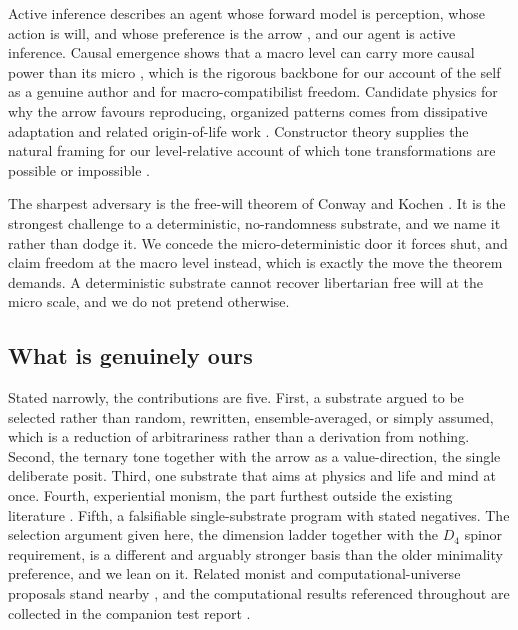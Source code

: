 Active inference describes an agent whose forward model is perception, whose action is will, and whose preference
is the arrow \cite{friston2010}, and our agent is active inference. Causal emergence shows that a macro level can
carry more causal power than its micro \cite{hoel2013}, which is the rigorous backbone for our account of the self
as a genuine author and for macro-compatibilist freedom. Candidate physics for why the arrow favours reproducing,
organized patterns comes from dissipative adaptation and related origin-of-life work \cite{england2013,
walkerdavies2013}. Constructor theory supplies the natural framing for our level-relative account of which tone
transformations are possible or impossible \cite{deutsch2013}.

The sharpest adversary is the free-will theorem of Conway and Kochen \cite{conwaykochen2009}. It is the strongest
challenge to a deterministic, no-randomness substrate, and we name it rather than dodge it. We concede the
micro-deterministic door it forces shut, and claim freedom at the macro level instead, which is exactly the
move the theorem demands. A deterministic substrate cannot recover libertarian free will at the micro scale, and
we do not pretend otherwise.

\subsection{What is genuinely ours}

Stated narrowly, the contributions are five. First, a substrate argued to be selected rather than random,
rewritten, ensemble-averaged, or simply assumed, which is a reduction of arbitrariness rather than a derivation
from nothing. Second, the ternary tone together with the arrow as a value-direction, the single deliberate posit.
Third, one substrate that aims at physics and life and mind at once. Fourth, experiential monism, the part
furthest outside the existing literature \cite{strawson2006, goff2017, whitehead1929}. Fifth, a falsifiable
single-substrate program with stated negatives. The selection argument given here, the dimension ladder together
with the $D_4$ spinor requirement, is a different and arguably stronger basis than the older minimality
preference, and we lean on it. Related monist and computational-universe proposals stand nearby
\cite{lloyd2006, tegmark2014, rovelli1996rqm}, and the computational results referenced throughout are collected
in the companion test report \cite{pollard2026vibetest}.
